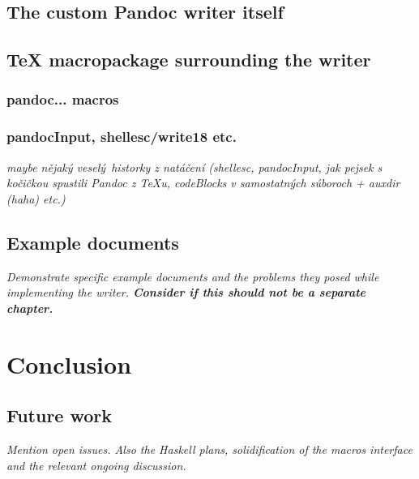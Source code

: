 \documentclass[
  digital,     %
  oneside,     %
  nosansbold,  %
  nocolorbold, %
  lof,         %
  lot,         %
]{fithesis4}
\begin{document}
\section{The custom Pandoc writer itself}
\section{\TeX{} macropackage surrounding the writer}
\subsection{pandoc... macros}
\subsection{pandocInput, shellesc/write18 etc.}
\emph{maybe nějaký veselý historky z natáčení (shellesc, pandocInput, jak pejsek s kočičkou spustili Pandoc z TeXu, codeBlocks v samostatných súboroch + auxdir (haha) etc.)}

\section{Example documents}
\emph{Demonstrate specific example documents and the problems they posed while implementing the writer. \label{fig:html-browsers-typeset} \textbf{Consider if this should not be a separate chapter.}}

% 


\chapter{Conclusion}
\section{Future work}
\emph{Mention open issues. Also the Haskell plans, solidification of the macros interface and the relevant ongoing discussion.}
\end{document}
